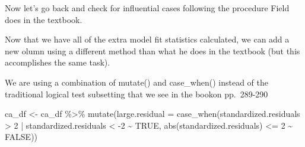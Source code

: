\documentclass[
]{book}
\newenvironment{Shaded}{\begin{snugshade}}{\end{snugshade}}
\newcommand{\AttributeTok}[1]{\textcolor[rgb]{0.77,0.63,0.00}{#1}}
\newcommand{\CommentTok}[1]{\textcolor[rgb]{0.56,0.35,0.01}{\textit{#1}}}
\newcommand{\ConstantTok}[1]{\textcolor[rgb]{0.00,0.00,0.00}{#1}}
\newcommand{\DecValTok}[1]{\textcolor[rgb]{0.00,0.00,0.81}{#1}}
\newcommand{\FunctionTok}[1]{\textcolor[rgb]{0.00,0.00,0.00}{#1}}
\newcommand{\NormalTok}[1]{#1}
\newcommand{\OtherTok}[1]{\textcolor[rgb]{0.56,0.35,0.01}{#1}}
\newcommand{\SpecialCharTok}[1]{\textcolor[rgb]{0.00,0.00,0.00}{#1}}
\begin{document}
Now let's go back and check for influential cases following the procedure Field does in the textbook.

\begin{Shaded}
\end{Shaded}

Now that we have all of the extra model fit statistics calculated, we can add a new olumn using a different method than what he does in the textbook (but this accomplishes the same task).

We are using a combination of mutate() and case\_when() instead of the traditional logical test subsetting that we see in the bookon pp.~289-290

\begin{Shaded}
\begin{Highlighting}[]
\NormalTok{ca\_df }\OtherTok{\textless{}{-}}\NormalTok{ ca\_df }\SpecialCharTok{\%\textgreater{}\%} 
  \FunctionTok{mutate}\NormalTok{(}\AttributeTok{large.residual =} \FunctionTok{case\_when}\NormalTok{(standardized.residuals }\SpecialCharTok{\textgreater{}} \DecValTok{2} \SpecialCharTok{|}\NormalTok{ standardized.residuals }\SpecialCharTok{\textless{}} \SpecialCharTok{{-}}\DecValTok{2} \SpecialCharTok{\textasciitilde{}} \ConstantTok{TRUE}\NormalTok{,}
                                    \FunctionTok{abs}\NormalTok{(standardized.residuals) }\SpecialCharTok{\textless{}=} \DecValTok{2} \SpecialCharTok{\textasciitilde{}} \ConstantTok{FALSE}\NormalTok{))}
\end{Highlighting}
\end{Shaded}
\end{document}
